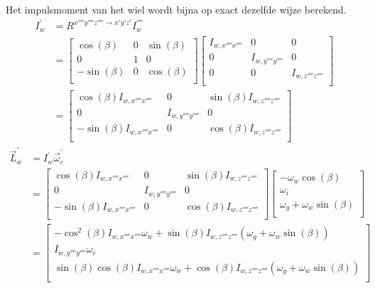 \begin{itemize}
Het impulsmoment van het wiel wordt bijna op exact dezelfde wijze berekend.
\begin{equation}
\begin{split}
I_{w}^{'}&=R^{x''''y''''z'''' \rightarrow x'y'z'}I_{w}^{''''}\\
&=\begin{bmatrix}
\cos(\beta)	&			0			&\sin(\beta)\\
0						&			1			&			0		 \\
-\sin(\beta)&			0			&\cos(\beta)\\
\end{bmatrix}
\begin{bmatrix}
I_{w,x''''x''''}&0&0\\
0&I_{w,y''''y''''}&0\\
0&0&I_{w,z''''z''''}\\
\end{bmatrix}\\
&=\begin{bmatrix}
\cos(\beta)I_{w,x''''x''''}	&		0		&\sin(\beta)I_{w,z''''z''''}\\
0			&			I_{w,y''''y''''}			&		0		 \\
-\sin(\beta)I_{w,x''''x''''}&		0		&\cos(\beta)I_{w,z''''z''''}\\
\end{bmatrix}
\end{split}
\label{eq:dyn2.3}
\end{equation}
\begin{equation}
\begin{split}
\vec{L}_{w}^{'}&=I_{w}^{'}\vec{\omega}_{c}^{'}\\
&=\begin{bmatrix}
\cos(\beta)I_{w,x''''x''''}	&		0		&\sin(\beta)I_{w,z''''z''''}\\
0			&			I_{w,y''''y''''}			&		0		 \\
-\sin(\beta)I_{w,x''''x''''}&		0		&\cos(\beta)I_{w,z''''z''''}\\
\end{bmatrix}
\begin{bmatrix}
-\omega_{w}\cos(\beta)	\\
\omega_{i}						\\
\omega_{g}+\omega_{w}\sin(\beta)	\\
\end{bmatrix}\\
&=\begin{bmatrix}
-\cos^{2}(\beta)I_{w,x''''x''''}\omega_{w}+\sin(\beta)I_{w,z''''z''''}(\omega_{g}+\omega_{w} \sin(\beta))	\\
I_{w,y''''y''''}\omega_{i}						\\
\sin(\beta)\cos(\beta)I_{w,x''''x''''}\omega_{w}+\cos(\beta)I_{w,z''''z''''}(\omega_{g}+\omega_{w} \sin(\beta))	\\
\end{bmatrix}
\end{split}
\label{eq:dyn2.4}
\end{equation}
\end{itemize}
\newpage
